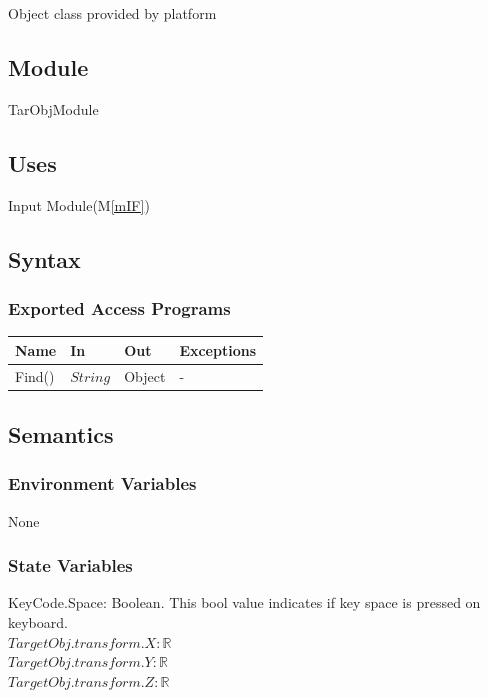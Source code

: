 \documentclass[12pt, titlepage]{article}
\newcommand{\mref}[1]{M\ref{#1}}
\begin{document}
Object class provided by platform

\subsection{Module}

TarObjModule

\subsection{Uses}

Input Module(\mref{mIF})

\subsection{Syntax}

\subsubsection{Exported Access Programs}

\begin{center}
	\begin{tabular}{p{2cm} p{4cm} p{4cm} p{2cm}}
		\hline
		\textbf{Name} & \textbf{In} & \textbf{Out} & \textbf{Exceptions} \\
		\hline
		Find() & $String$ & Object & - \\
		\hline		
	\end{tabular}
\end{center}

\subsection{Semantics}

\subsubsection{Environment Variables}
None
\subsubsection{State Variables}

KeyCode.Space: Boolean.
This bool value indicates if key space is pressed on keyboard.\\
$TargetObj.transform.X: \mathbb{R}$\\
$TargetObj.transform.Y: \mathbb{R}$\\
$TargetObj.transform.Z: \mathbb{R}$
\end{document}
